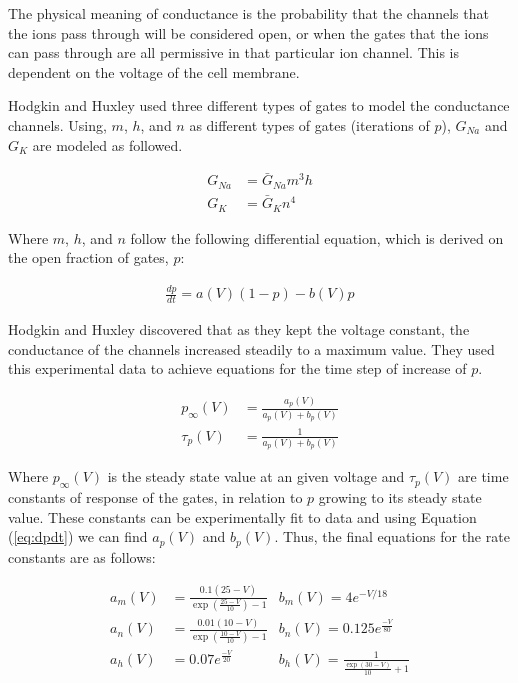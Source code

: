 \documentclass[12]{book}
\newcommand\0{\mathbf{0}}
\newcommand\<{\langle}
\renewcommand\>{\rangle}
\begin{document}
The physical meaning of conductance is the probability that the channels that the ions pass through will be considered open, or when the gates that the ions can pass through are all permissive in that particular ion channel. This is dependent on the voltage of the cell membrane. 

Hodgkin and Huxley used three different types of gates to model the conductance channels. Using, $m$, $h$, and $n$ as different types of gates (iterations of $p$), $G_{Na}$ and $G_K$ are modeled as followed.

\begin{align*}
    G_{Na} &= \bar{G}_{Na}m^3h\\
    G_{K} &= \bar{G}_{K}n^4
\end{align*}

Where $m$, $h$, and $n$ follow the following differential equation, which is derived on the open fraction of gates, $p$:

\begin{align}
\label{eq:dpdt}
    \frac{dp}{dt} = a(V)(1-p) - b(V)p
\end{align}

Hodgkin and Huxley discovered that as they kept the voltage constant, the conductance of the channels increased steadily to a maximum value. They used this experimental data to achieve equations for the time step of increase of $p$.

\begin{align}
\label{eq:time}
    p_{\infty}(V) &= \frac{a_p(V)}{a_p(V) + b_p(V)} \\
    \tau_p(V) &= \frac{1}{a_p(V) + b_p(V)} 
\end{align}

Where $p_{\infty}(V)$ is the steady state value at an given voltage and ${\tau_p}(V)$ are time constants of response of the gates, in relation to $p$ growing to its steady state value. These constants can be experimentally fit to data and using Equation (\ref{eq:dpdt}) we can find $a_p(V)$ and $b_p(V)$. Thus, the final equations for the rate constants are as follows:

\begin{align*}
    a_m(V) &= \frac{0.1(25-V)}{\exp(\frac{25-V}{10})-1}
    &b_m(V) = 4e^{-V/18} \\
    a_n(V) &= \frac{0.01(10-V)}{\exp(\frac{10-V}{10})-1} 
    &b_n(V) = 0.125e^{\frac{-V}{80}}\\
    a_h(V) &= 0.07e^{\frac{-V}{20}} 
    &b_h(V) = \frac{1}{\frac{\exp(30-V)}{10}+1}
\end{align*}
\end{document}
